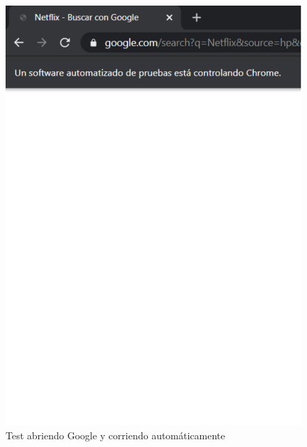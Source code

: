 \documentclass[conference]{IEEEtran}
\begin{document}
\begin{figure}[H]
\centering
\includegraphics[scale=0.47]{imagenes/Imagen 001.pdf}
\caption{Test abriendo Google y corriendo automáticamente}
\end{figure}
\end{document}
